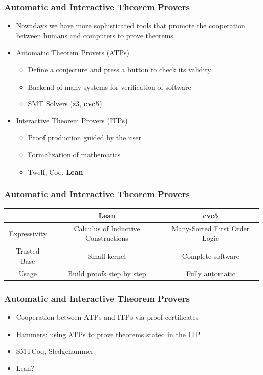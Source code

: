 \documentclass[usepdftitle=false,aspectratio=169,usenames,dvipsnames]{beamer}
\newcommand\vitem{\vfill\item}
\begin{document}
\begin{frame}
  \frametitle{Automatic and Interactive Theorem Provers}

  \begin{itemize}
    \item Nowadays we have more sophisticated tools that promote the cooperation between humans and computers to prove theorems
    \vitem Automatic Theorem Provers (ATPs)
    \begin{itemize}
      \item Define a conjecture and press a button to check its validity
      \item Backend of many systems for verification of software
      \item SMT Solvers (z3, \textbf{cvc5})
    \end{itemize}
    \vitem Interactive Theorem Provers (ITPs)
    \begin{itemize}
      \item Proof production guided by the user
      \item Formalization of mathematics
      \item Twelf, Coq, \textbf{Lean}
    \end{itemize}
  \end{itemize}
\end{frame}

\begin{frame}
  \frametitle{Automatic and Interactive Theorem Provers}
  \begin{table}[]
  \begin{tabular}{|c|c|c|}
  \hline
              & \textbf{Lean}                                & \textbf{cvc5}                          \\ \hline
  Expressivity & Calculus of Inductive Constructions & Many-Sorted First Order Logic \\
  Trusted Base & Small kernel                        & Complete software             \\
  Usage        & Build proofs step by step           & Fully automatic               \\ \hline
  \end{tabular}
  \end{table}
\end{frame}


\begin{frame}
  \frametitle{Automatic and Interactive Theorem Provers}
  \begin{itemize}
    \item Cooperation between ATPs and ITPs via proof certificates
    \vitem Hammers: using ATPs to prove theorems stated in the ITP
    \vitem SMTCoq, Sledgehammer
    \vitem Lean?
  \end{itemize}
\end{frame}
\end{document}
